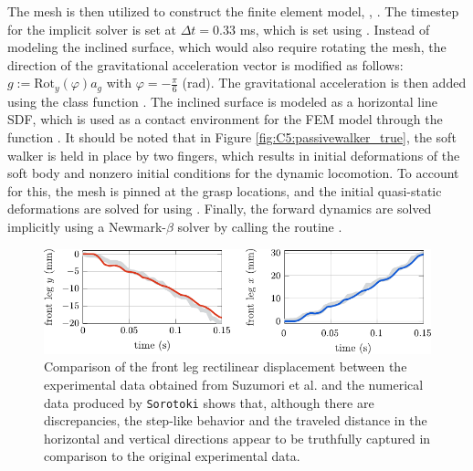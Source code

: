 



The mesh is then utilized to construct the finite element model, \ie, . The timestep for the implicit solver is set at $\Delta t = 0.33$ \si{\milli \second}, which is set using . Instead of modeling the inclined surface, which would also require rotating the mesh, the direction of the gravitational acceleration vector is modified as follows: $g := \textrm{Rot}_y(\varphi) a_g$ with $\varphi = -\frac{\pi}{6}$ (rad). The gravitational acceleration is then added using the class function . The inclined surface is modeled as a horizontal line SDF, which is used as a contact environment for the FEM model through the function . It should be noted that in Figure \ref{fig:C5:passivewalker_true}, the soft walker is held in place by two fingers, which results in initial deformations of the soft body and nonzero initial conditions for the dynamic locomotion. To account for this, the mesh is pinned at the grasp locations, and the initial quasi-static deformations are solved for using . Finally, the forward dynamics are solved implicitly using a Newmark-$\beta$ solver by calling the routine .

%
\begin{figure}[!t]
    \centering
    \includegraphics*[width=.99\textwidth]{./pdf/thesis-figure-6-19-1.pdf}
    \caption{\small Comparison of the front leg rectilinear displacement between the experimental data obtained from Suzumori et al. \cite{Suzumori2008Sep} and the numerical data produced by \texttt{Sorotoki} shows that, although there are discrepancies, the step-like behavior and the traveled distance in the horizontal and vertical directions appear to be truthfully captured in comparison to the original experimental data. }
    \label{fig:C5:passivewalker_compare}
\end{figure}
%

